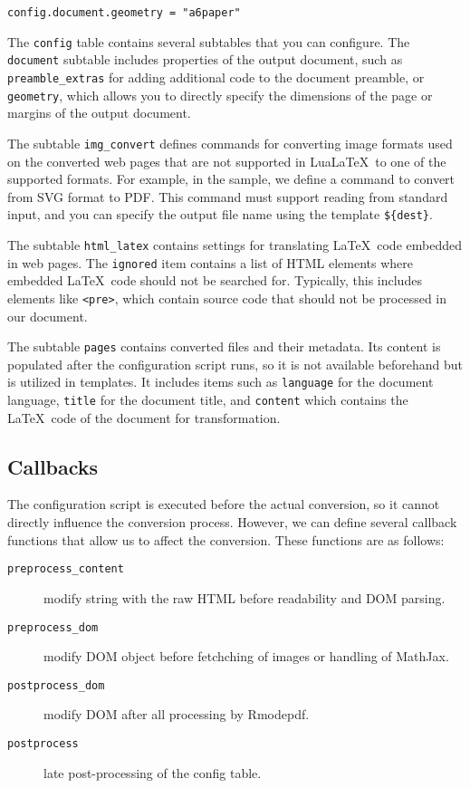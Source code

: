 \documentclass{ltugboat}
\begin{document}
\begin{verbatim}
config.document.geometry = "a6paper"
\end{verbatim}

The \texttt{config} table contains several subtables that you can configure.
The \texttt{document} subtable includes properties of the output document, such
as \texttt{preamble\_extras} for adding additional code to the document
preamble, or \texttt{geometry}, which allows you to directly specify the
dimensions of the page or margins of the output document.

The subtable \texttt{img\_convert} defines commands for converting image formats
used on the converted web pages that are not supported in Lua\LaTeX\ to one of
the supported formats. For example, in the sample, we define a command to
convert from SVG format to PDF. This command must support reading from standard
input, and you can specify the output file name using the template \verb|${dest}|.

The subtable \texttt{html\_latex} contains settings for translating \LaTeX\ code
embedded in web pages. The \texttt{ignored} item contains a list of HTML
elements where embedded \LaTeX\ code should not be searched for. Typically, this
includes elements like \verb|<pre>|, which contain source code that should
not be processed in our document.

The subtable \texttt{pages} contains converted files and their metadata. Its
content is populated after the configuration script runs, so it is not
available beforehand but is utilized in templates. It includes items such as
\texttt{language} for the document language, \texttt{title} for the document
title, and \texttt{content} which contains the \LaTeX\ code of the document for
transformation.

\subsection{Callbacks}


The configuration script is executed before the actual conversion, so it cannot
directly influence the conversion process. However, we can define several
callback functions that allow us to affect the conversion. These functions are
as follows:

\begin{description}
  \item[\texttt{preprocess\_content}] modify string with the raw HTML before
    readability and DOM parsing.
  \item[\texttt{preprocess\_dom}] modify DOM object before fetchching of images
    or handling of MathJax.
  \item[\texttt{postprocess\_dom}] modify DOM after all processing by Rmodepdf.
  \item[\texttt{postprocess}] late post-processing of the config table.
\end{description}
\end{document}
